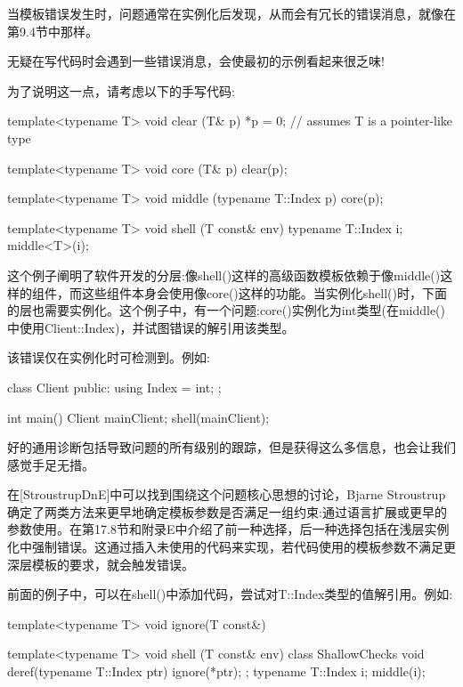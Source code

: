 当模板错误发生时，问题通常在实例化后发现，从而会有冗长的错误消息，就像在第9.4节中那样。

\begin{notice}无疑在写代码时会遇到一些错误消息，会使最初的示例看起来很乏味!
\end{notice}

为了说明这一点，请考虑以下的手写代码:

\begin{cpp}
template<typename T>
void clear (T& p)
{
	*p = 0; // assumes T is a pointer-like type
}

template<typename T>
void core (T& p)
{
	clear(p);
}

template<typename T>
void middle (typename T::Index p)
{
	core(p);
}

template<typename T>
void shell (T const& env)
{
	typename T::Index i;
	middle<T>(i);
}
\end{cpp}

这个例子阐明了软件开发的分层:像shell()这样的高级函数模板依赖于像middle()这样的组件，而这些组件本身会使用像core()这样的功能。当实例化shell()时，下面的层也需要实例化。这个例子中，有一个问题:core()实例化为int类型(在middle()中使用Client::Index)，并试图错误的解引用该类型。

该错误仅在实例化时可检测到。例如:

\begin{cpp}
class Client
{
	public:
	using Index = int;
};

int main()
{
	Client mainClient;
	shell(mainClient);
}
\end{cpp}

好的通用诊断包括导致问题的所有级别的跟踪，但是获得这么多信息，也会让我们感觉手足无措。

在[StroustrupDnE]中可以找到围绕这个问题核心思想的讨论，Bjarne Stroustrup确定了两类方法来更早地确定模板参数是否满足一组约束:通过语言扩展或更早的参数使用。在第17.8节和附录E中介绍了前一种选择，后一种选择包括在浅层实例化中强制错误。这通过插入未使用的代码来实现，若代码使用的模板参数不满足更深层模板的要求，就会触发错误。

前面的例子中，可以在shell()中添加代码，尝试对T::Index类型的值解引用。例如:

\begin{cpp}
template<typename T>
void ignore(T const&)
{ }

template<typename T>
void shell (T const& env)
{
	class ShallowChecks
	{
		void deref(typename T::Index ptr) {
			ignore(*ptr);
		}
	};
	typename T::Index i;
	middle(i);
}
\end{cpp}

